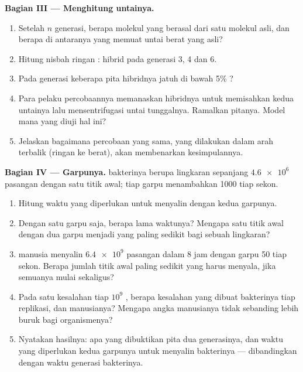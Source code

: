 \begin{problem}
\medskip
\noindent\textbf{Bagian III --- Menghitung untainya.}
\begin{enumerate}[resume]
  \item Setelah $n$ generasi, berapa molekul  yang berasal dari satu
        molekul asli, dan berapa di antaranya yang memuat untai berat
        yang asli?
  \item Hitung nisbah ringan : hibrid pada generasi 3, 4 dan 6.
  \item Pada generasi keberapa pita hibridnya jatuh di bawah 5\%
        ?
  \item Para pelaku percobaannya memanaskan  hibridnya untuk
        memisahkan kedua untainya lalu mensentrifugasi untai
        tunggalnya. Ramalkan pitanya. Model mana yang diuji hal ini?
  \item Jelaskan bagaimana percobaan yang sama, yang dilakukan dalam
        arah terbalik (ringan ke berat), akan membenarkan kesimpulannya.
\end{enumerate}

\medskip
\noindent\textbf{Bagian IV --- Garpunya.}
 bakterinya berupa lingkaran sepanjang $\num{4.6e6}$ pasangan
 dengan satu titik awal; tiap garpu menambahkan 1000  tiap sekon.
\begin{enumerate}[resume]
  \item Hitung waktu yang diperlukan untuk menyalin  dengan
        kedua garpunya.
  \item Dengan satu garpu saja, berapa lama waktunya? Mengapa satu
        titik awal dengan dua garpu menjadi yang paling sedikit bagi
        sebuah lingkaran?
  \item {} manusia menyalin $\num{6.4e9}$ pasangan  dalam 8 jam
        dengan garpu 50  tiap sekon. Berapa jumlah titik awal
        paling sedikit yang harus menyala, jika semuanya mulai sekaligus?
  \item Pada satu kesalahan tiap $10^9$ , berapa kesalahan
        yang dibuat bakterinya tiap replikasi, dan  manusianya?
        Mengapa angka manusianya tidak sebanding lebih buruk bagi
        organismenya?
  \item Nyatakan hasilnya: apa yang dibuktikan pita dua generasinya,
        dan waktu yang diperlukan kedua garpunya untuk menyalin 
        bakterinya --- dibandingkan dengan waktu generasi bakterinya.
\end{enumerate}
\end{problem}
